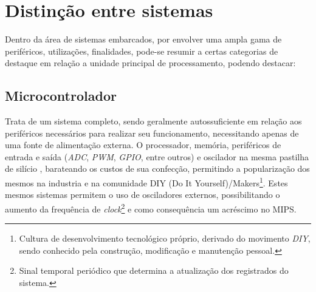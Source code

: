 \section{Distinção entre sistemas}
Dentro da área de sistemas embarcados, por envolver uma ampla gama de periféricos, utilizações, finalidades, pode-se resumir a certas categorias de destaque em relação a unidade principal de processamento, podendo destacar:

\subsection{Microcontrolador}

Trata de um sistema completo, sendo geralmente autossuficiente em relação aos periféricos necessários para realizar seu funcionamento, necessitando apenas de uma fonte de alimentação externa. O processador, memória, periféricos de entrada e saída (\textit{ADC}, \textit{PWM}, \textit{GPIO}, entre outros) e oscilador na mesma pastilha de silício , barateando os custos de sua confecção, permitindo a popularização dos mesmos na industria e na comunidade DIY (Do It Yourself)/Makers\footnote{Cultura de desenvolvimento tecnológico próprio, derivado do movimento \textit{DIY}, sendo conhecido pela construção, modificação e manutenção pessoal.}. Estes mesmos
sistemas permitem o uso de osciladores externos, possibilitando o aumento da frequência de \textit{clock}\footnote{Sinal temporal periódico que determina a atualização dos registrados do sistema.} e como consequência um acréscimo no MIPS.

